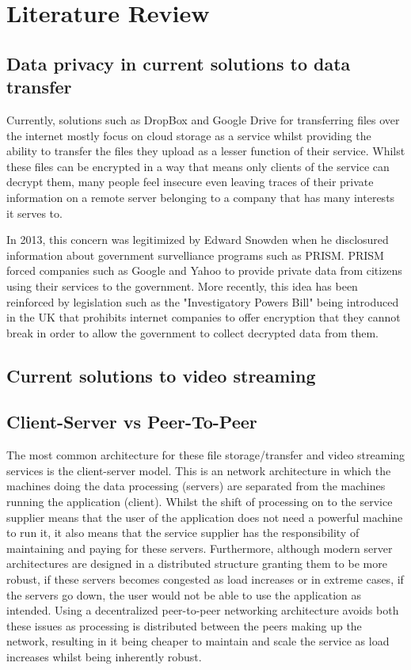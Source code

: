 \documentclass[]{report}
\begin{document}
	\section{Literature Review}
		\subsection*{Data privacy in current solutions to data transfer}
			Currently, solutions such as DropBox and Google Drive for transferring files over the internet mostly focus on cloud storage as a service whilst providing the ability to transfer the files they upload as a lesser function of their service. Whilst these files can be encrypted in a way that means only clients of the service can decrypt them, many people feel insecure even leaving traces of their private information on a remote server belonging to a company that has many interests it serves to. 
			
			In 2013, this concern was legitimized by Edward Snowden when he disclosured information about government survelliance programs such as PRISM. PRISM forced companies such as Google and Yahoo to provide private data from citizens using their services to the government.  More recently, this idea has been reinforced by legislation such as the "Investigatory Powers Bill"  being introduced in the UK that prohibits internet companies to offer encryption that they cannot break in order to allow the government to collect decrypted data from them. 
		\subsection*{Current solutions to video streaming}
		\subsection*{Client-Server vs Peer-To-Peer}
			The most common architecture for these file storage/transfer and video streaming services is the client-server model. This is an network architecture in which the machines doing the data processing (servers) are separated from the machines running the application (client). Whilst the shift of processing on to the service supplier means that the user of the application does not need a powerful machine to run it, it also means that the service supplier has the responsibility of maintaining and paying for these servers. Furthermore, although modern server architectures are designed in a distributed structure granting them to be more robust, if these servers becomes congested as load increases or in extreme cases, if the servers go down, the user would not be able to use the application as intended. Using a decentralized peer-to-peer networking architecture avoids both these issues as processing is distributed between the peers making up the network, resulting in it being cheaper to maintain and scale the service as load increases whilst being inherently robust. 
		
\end{document}
